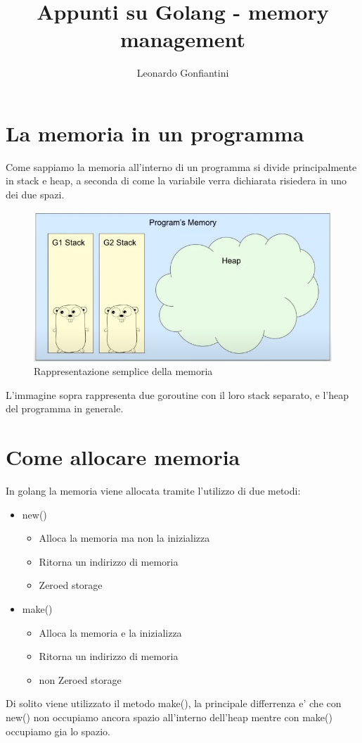 \documentclass{article}
\title{Appunti su Golang - memory management}
\author{Leonardo Gonfiantini}
\date{}
\begin{document}
\maketitle

\section{La memoria in un programma}

Come sappiamo la memoria all'interno di un programma si divide principalmente in stack e heap, a seconda di come la variabile verra dichiarata risiedera in uno dei due spazi.

\begin{figure}[h!]
  \includegraphics[width=\linewidth]{heap-stack.jpeg}
  \caption{Rappresentazione semplice della memoria}
  \label{fig: go1}
\end{figure}

L'immagine sopra rappresenta due goroutine con il loro stack separato, e l'heap del programma in generale.

\section{Come allocare memoria}
In golang la memoria viene allocata tramite l'utilizzo di due metodi:
\begin{itemize}
    \item new()
        \begin{itemize}
            \item Alloca la memoria ma non la inizializza
            \item Ritorna un indirizzo di memoria
            \item Zeroed storage
        \end{itemize}
    
    \item make()
        \begin{itemize}
            \item Alloca la memoria e la inizializza
            \item Ritorna un indirizzo di memoria
            \item non Zeroed storage
        \end{itemize}
\end{itemize}

Di solito viene utilizzato il metodo make(), la principale differrenza e' che con new() non occupiamo ancora spazio all'interno dell'heap mentre con make() occupiamo gia lo spazio.





\end{document}
